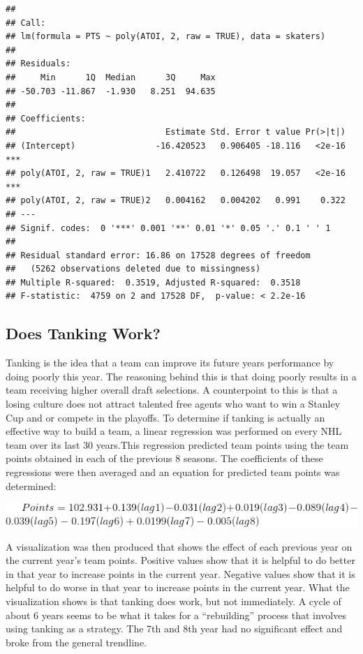 \documentclass[]{article}
\begin{document}
\begin{verbatim}
## 
## Call:
## lm(formula = PTS ~ poly(ATOI, 2, raw = TRUE), data = skaters)
## 
## Residuals:
##     Min      1Q  Median      3Q     Max 
## -50.703 -11.867  -1.930   8.251  94.635 
## 
## Coefficients:
##                              Estimate Std. Error t value Pr(>|t|)    
## (Intercept)                -16.420523   0.906405 -18.116   <2e-16 ***
## poly(ATOI, 2, raw = TRUE)1   2.410722   0.126498  19.057   <2e-16 ***
## poly(ATOI, 2, raw = TRUE)2   0.004162   0.004202   0.991    0.322    
## ---
## Signif. codes:  0 '***' 0.001 '**' 0.01 '*' 0.05 '.' 0.1 ' ' 1
## 
## Residual standard error: 16.86 on 17528 degrees of freedom
##   (5262 observations deleted due to missingness)
## Multiple R-squared:  0.3519, Adjusted R-squared:  0.3518 
## F-statistic:  4759 on 2 and 17528 DF,  p-value: < 2.2e-16
\end{verbatim}

\hypertarget{does-tanking-work}{%
\subsection{Does Tanking Work?}\label{does-tanking-work}}

Tanking is the idea that a team can improve its future years performance
by doing poorly this year. The reasoning behind this is that doing
poorly results in a team receiving higher overall draft selections. A
counterpoint to this is that a losing culture does not attract talented
free agents who want to win a Stanley Cup and or compete in the
playoffs. To determine if tanking is actually an effective way to build
a team, a linear regression was performed on every NHL team over its
last 30 years.This regression predicted team points using the team
points obtained in each of the previous 8 seasons. The coefficients of
these regressions were then averaged and an equation for predicted team
points was determined:

\includegraphics[width=0.9\linewidth]{tanking_results}

A visualization was then produced that shows the effect of each previous
year on the current year's team points. Positive values show that it is
helpful to do better in that year to increase points in the current
year. Negative values show that it is helpful to do worse in that year
to increase points in the current year. What the visualization shows is
that tanking does work, but not immediately. A cycle of about 6 years
seems to be what it takes for a ``rebuilding'' process that involves
using tanking as a strategy. The 7th and 8th year had no significant
effect and broke from the general trendline.
\end{document}
